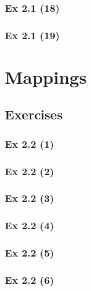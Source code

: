 \subsubsection{Ex 2.1 (18)}\label{sec:Ex_2.1.18}

\subsubsection{Ex 2.1 (19)}\label{sec:Ex_2.1.19}

\newpage		%

\section{Mappings}\label{sec:2.2}
\subsection{Exercises}\label{sec:2.2_Exercises}

\subsubsection{Ex 2.2 (1)}\label{sec:Ex_2.2.1}

\subsubsection{Ex 2.2 (2)}\label{sec:Ex_2.2.2}

\subsubsection{Ex 2.2 (3)}\label{sec:Ex_2.2.3}

\subsubsection{Ex 2.2 (4)}\label{sec:Ex_2.2.4}

\subsubsection{Ex 2.2 (5)}\label{sec:Ex_2.2.5}

\subsubsection{Ex 2.2 (6)}\label{sec:Ex_2.2.6}


